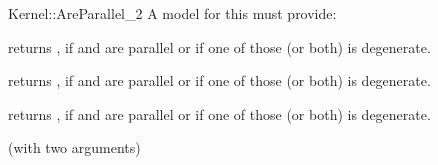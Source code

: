 \begin{ccRefFunctionObjectConcept}{Kernel::AreParallel_2}
A model for this must provide:


{returns , if  and  are parallel or if one
of those (or both) is degenerate.}

{returns , if  and  are parallel or if one
of those (or both) is degenerate.}

{returns , if  and  are parallel or if one
of those (or both) is degenerate.}

\ccRefines
{} (with two arguments)

\ccSeeAlso
{} \\

\end{ccRefFunctionObjectConcept}
